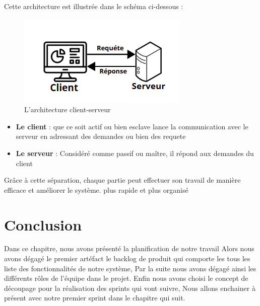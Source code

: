 Cette architecture est illustrée dans le schéma ci-dessous :

\begin{figure}[H]
    \centering
    \includegraphics[width=0.6\linewidth]{projet/images/diagramme de sequance/client-serveur.png}
    \caption{L’architecture client-serveur}
    \label{fig:equipe_scrum}
\end{figure}
\begin{itemize}
    \item \textbf{Le client} : que ce soit actif ou bien esclave lance la communication avec le serveur en adressant des demandes ou bien des requete
    \item \textbf{Le serveur} : Considéré comme passif ou maître, il répond aux demandes du client
\end{itemize}

Grâce à cette séparation, chaque partie peut effectuer son travail de manière efficace et améliorer le système. plus rapide et plus organisé\\
\section*{Conclusion}
Dans ce chapitre, nous avons présenté la planification de notre travail Alors
nous avons dégagé le premier artéfact le backlog de produit qui comporte les tous les liste des fonctionnalités de notre système, Par la suite nous avons dégagé ainsi les différents rôles de l’équipe dans le projet. Enfin nous avons choisi le concept de découpage pour la réalisation des sprints qui vont suivre, Nous allons enchainer à présent avec notre premier sprint dans le
chapitre qui suit.